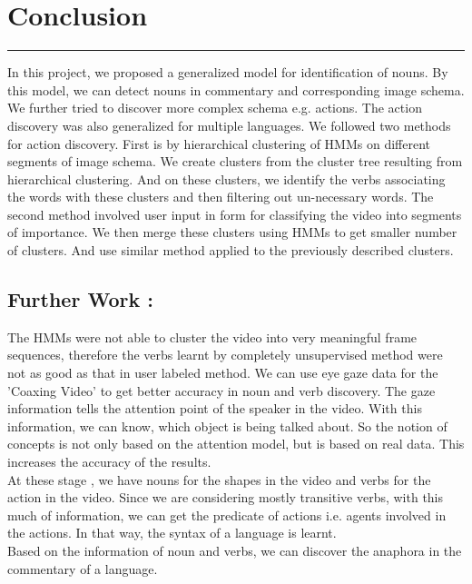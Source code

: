 \def\DevnagVersion{2.15}\documentclass[a4paper, 11pt, notitlepage]{report}
\begin{document}

\chapter{Conclusion}
\hrule height 2pt
\vspace*{10pt} 
In this project, we proposed a generalized model for identification of nouns. By this model, we can detect nouns in commentary and corresponding image schema. We further tried to discover more complex schema e.g. actions. The action discovery was also generalized for multiple languages. We followed two methods for action discovery. First is by hierarchical clustering of HMMs on different segments of image schema. We create clusters from the cluster tree resulting from hierarchical clustering. And on these clusters, we identify the verbs associating the words with these clusters and then filtering out un-necessary words. The second method involved user input in form for classifying the video into segments of importance. We then merge these clusters using HMMs to get smaller number of clusters. And use similar method applied to the previously described clusters.\\
\section{Further Work :}

\hspace*{15pt} The HMMs were not able to cluster the video into very meaningful frame sequences, therefore the verbs learnt by completely unsupervised method were not as good as that in user labeled method. We can use eye gaze data for the 'Coaxing Video' to get better accuracy in noun and verb discovery. The gaze information tells the attention point of the speaker in the video. With this information, we can know, which object is being talked about. So the notion of concepts is not only based on the attention model, but is based on real data. This increases the accuracy of the results.\\ 
\hspace*{15pt} At these stage , we have nouns for the shapes in the video and verbs for the action in the video. Since we are considering mostly transitive verbs, with this much of information, we can get the predicate of actions i.e. agents involved in the actions. In that way, the syntax of a language is learnt.\\
\hspace*{15pt} Based on the information of noun and verbs, we can discover the anaphora\cite{neema-mukerjee-10_discovering-concept-of-anaphora} in the commentary of a language.
\end{document}
